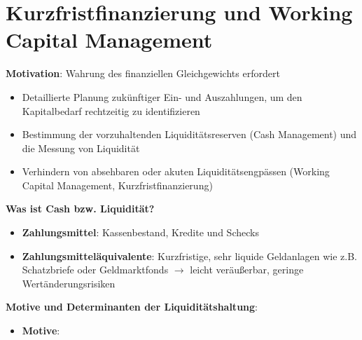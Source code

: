 \section{Kurzfristfinanzierung und Working Capital Management}

\textbf{Motivation}: Wahrung des finanziellen Gleichgewichts erfordert
\begin{itemize}
	\item Detaillierte Planung zukünftiger Ein- und Auszahlungen, um den Kapitalbedarf rechtzeitig zu identifizieren
	\item Bestimmung der vorzuhaltenden Liquiditätsreserven (Cash Management) und die Messung von Liquidität
	\item Verhindern von absehbaren oder akuten Liquiditätsengpässen (Working Capital Management, Kurzfristfinanzierung)
\end{itemize}
\bigskip
\textbf{Was ist Cash bzw. Liquidität?}
\begin{itemize}
	\item \textbf{Zahlungsmittel}: Kassenbestand, Kredite und Schecks
	\item \textbf{Zahlungsmitteläquivalente}: Kurzfristige, sehr liquide Geldanlagen wie z.B. Schatzbriefe oder Geldmarktfonds $\rightarrow$ leicht veräußerbar, geringe Wertänderungsrisiken
\end{itemize}
\bigskip
\textbf{Motive und Determinanten der Liquiditätshaltung}:
\begin{itemize}
	\item \textbf{Motive}: 
\end{itemize}